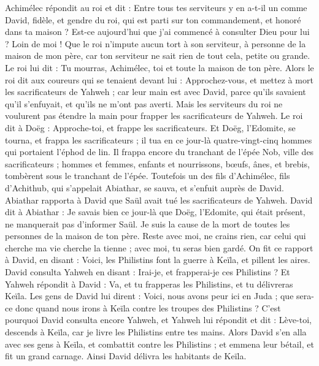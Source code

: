 \begin{multicols}{2}
Achimélec répondit au roi et dit : Entre tous tes serviteurs y en a-t-il un comme David, fidèle, et gendre du roi, qui est parti sur ton commandement, et honoré dans ta maison ?
Est-ce aujourd'hui que j'ai commencé à consulter Dieu pour lui ? Loin de moi ! Que le roi n'impute aucun tort à son serviteur, à personne de la maison de mon père, car ton serviteur ne sait rien de tout cela, petite ou grande.
Le roi lui dit : Tu mourras, Achimélec, toi et toute la maison de ton père.
Alors le roi dit aux coureurs qui se tenaient devant lui : Approchez-vous, et mettez à mort les sacrificateurs de Yahweh ; car leur main est avec David, parce qu'ils savaient qu'il s'enfuyait, et qu'ils ne m'ont pas averti. Mais les serviteurs du roi ne voulurent pas étendre la main pour frapper les sacrificateurs de Yahweh.
Le roi dit à Doëg : Approche-toi, et frappe les sacrificateurs. Et Doëg, l'Edomite, se tourna, et frappa les sacrificateurs ; il tua en ce jour-là quatre-vingt-cinq hommes qui portaient l'éphod de lin.
Il frappa encore du tranchant de l'épée Nob, ville des sacrificateurs ; hommes et femmes, enfants et nourrissons, bœufs, ânes, et brebis, tombèrent sous le tranchant de l'épée.
Toutefois un des fils d'Achimélec, fils d'Achithub, qui s'appelait Abiathar, se sauva, et s'enfuit auprès de David.
Abiathar rapporta à David que Saül avait tué les sacrificateurs de Yahweh.
David dit à Abiathar : Je savais bien ce jour-là que Doëg, l'Edomite, qui était présent, ne manquerait pas d'informer Saül. Je suis la cause de la mort de toutes les personnes de la maison de ton père.
Reste avec moi, ne crains rien, car celui qui cherche ma vie cherche la tienne ; avec moi, tu seras bien gardé.
\VerseOne{}On fit ce rapport à David, en disant : Voici, les Philistins font la guerre à Keïla, et pillent les aires.
David consulta Yahweh en disant : Irai-je, et frapperai-je ces Philistins ? Et Yahweh répondit à David : Va, et tu frapperas les Philistins, et tu délivreras Keïla.
Les gens de David lui dirent : Voici, nous avons peur ici en Juda ; que sera-ce donc quand nous irons à Keïla contre les troupes des Philistins ?
C'est pourquoi David consulta encore Yahweh, et Yahweh lui répondit et dit : Lève-toi, descends à Keïla, car je livre les Philistins entre tes mains.
Alors David s'en alla avec ses gens à Keïla, et combattit contre les Philistins ; et emmena leur bétail, et fit un grand carnage. Ainsi David délivra les habitants de Keïla.

\end{multicols}
